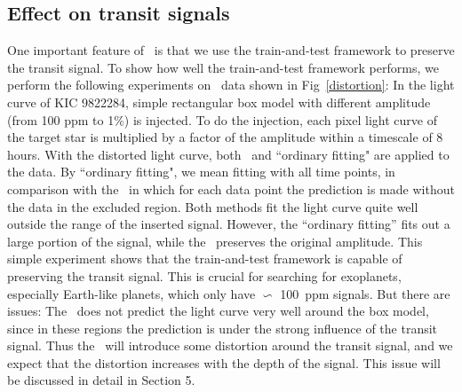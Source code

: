 \subsection{Effect on transit signals}
One important feature of \name\ is that we use the train-and-test framework to preserve 
the transit signal. To show how well the train-and-test framework performs, we perform the following experiments on \Kepler\ data shown in Fig~\ref{distortion}:
In the light curve of KIC 9822284, simple rectangular box model with different amplitude (from 100 ppm to 1\%) is injected. To do the injection, each pixel light curve of the target star is multiplied by a factor of the amplitude within a timescale of 8 hours.
With the distorted light curve, both \name\ and ``ordinary fitting" are applied to the data. 
By ``ordinary fitting", we mean fitting with all time points,  in comparison with the \name\, in which for each data point the prediction is made without the data in the excluded region.
Both methods fit the light curve quite well outside the range of the inserted signal. 
However, the ``ordinary fitting'' fits out a large portion of the signal, while the \name\ preserves the original amplitude. 
This simple experiment shows that the train-and-test framework is capable of preserving the transit signal. 
This is crucial for searching for exoplanets, especially Earth-like planets, which only have $\backsim$ 100\ ppm signals.
But there are issues: 
The \name\ does not predict the light curve very well around the box model, since in these regions the prediction is under the strong influence of the transit signal. 
Thus the \name\ will introduce some distortion around the transit signal, and we expect that the distortion increases with the depth of the signal. This issue will be discussed in detail in Section 5.

